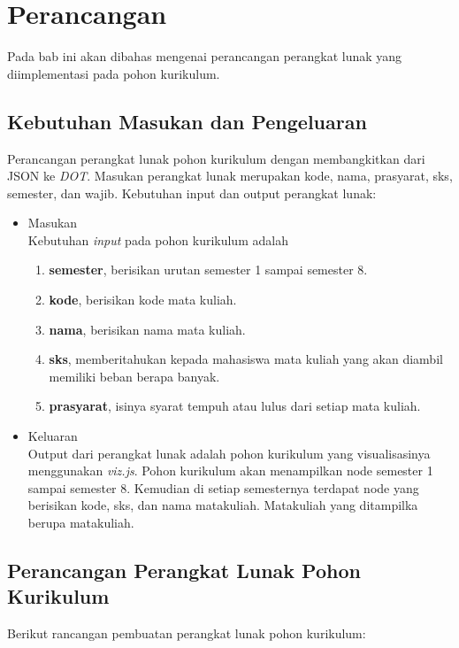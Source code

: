 \chapter{Perancangan}
\label{chap: Perancangan}

Pada bab ini akan dibahas mengenai perancangan perangkat lunak yang diimplementasi pada pohon kurikulum.

\section{Kebutuhan Masukan dan Pengeluaran}
\label{sec: Kebutuhan Masukan dan Pengeluaran}
Perancangan perangkat lunak pohon kurikulum dengan membangkitkan dari JSON ke \textit{DOT}. Masukan perangkat lunak merupakan kode, nama, prasyarat, sks, semester, dan wajib.
Kebutuhan input dan output perangkat lunak:
\begin{itemize}
\item Masukan \\
Kebutuhan \textit{input} pada pohon kurikulum adalah
\begin{enumerate}
\item \textbf{semester}, berisikan urutan semester 1 sampai semester 8.
\item \textbf{kode}, berisikan kode mata kuliah.
\item \textbf{nama}, berisikan nama mata kuliah.
\item \textbf{sks}, memberitahukan kepada mahasiswa mata kuliah yang akan diambil memiliki beban berapa banyak.
\item \textbf{prasyarat}, isinya syarat tempuh atau lulus dari setiap mata kuliah.
\end{enumerate}
\item Keluaran\\
Output dari perangkat lunak adalah pohon kurikulum yang visualisasinya menggunakan \textit{viz.js}. Pohon kurikulum akan menampilkan node semester 1 sampai semester 8. Kemudian di setiap semesternya terdapat node yang berisikan kode, sks, dan nama matakuliah. Matakuliah yang ditampilka berupa matakuliah.
\end{itemize}

\section{Perancangan Perangkat Lunak Pohon Kurikulum}
\label{sec: Perancangan Perangkat Lunak Pohon Kurikulum}
Berikut rancangan pembuatan perangkat lunak pohon kurikulum:

